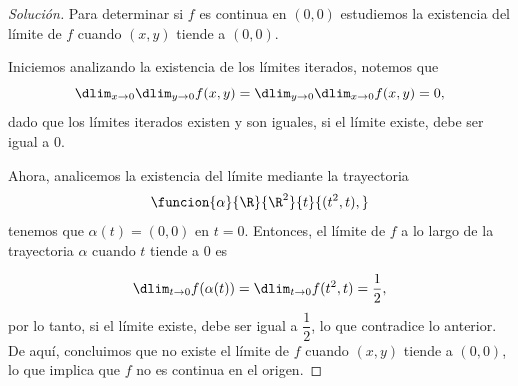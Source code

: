 \documentclass[a4,11pt]{aleph-notas}
\begin{document}
\begin{proof}[Solución]
Para determinar si $f$ es continua en $(0,0)$ estudiemos la existencia del límite de $f$ cuando $(x,y)$ tiende a $(0,0)$.
    
    Iniciemos analizando la existencia de los límites iterados, notemos que
    \[
        \dlim_{x\to 0}\dlim_{y\to 0}f(x,y)=\dlim_{y\to 0}\dlim_{x\to 0}f(x,y)=0,
    \]
    dado que los límites iterados existen y son iguales, si el límite existe, debe ser igual a 0.
    
    Ahora, analicemos la existencia del límite mediante la trayectoria
    \[
        \funcion{\alpha}{\R}{\R^2}{t}{(t^2,t),}
    \]
    tenemos que $\alpha(t)=(0,0)$ en $t=0$. Entonces, el límite de $f$ a lo largo de la trayectoria $\alpha$ cuando $t$ tiende a 0 es
    
    \[
        \dlim_{t\to0}{f(\alpha(t))}=\dlim_{t\to0}{f(t^2,t)}=\dfrac{1}{2},
    \]
    por lo tanto, si el límite existe, debe ser igual a $\dfrac{1}{2}$, lo que contradice lo anterior. De aquí, concluimos que no existe el límite de $f$ cuando $(x,y)$ tiende a $(0,0)$, lo que implica que $f$ no es continua en el origen.
\end{proof}

\end{document}
